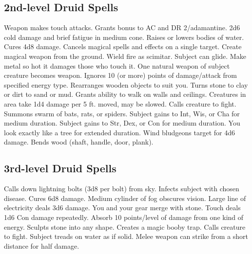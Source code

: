 \subsection{2nd-level Druid Spells}
\begin{spelllist}
   Weapon makes touch attacks. 
   Grants  bonus to AC and DR 2/adamantine.
   2d6 cold damage and brief fatigue in medium cone.
   Raises or lowers bodies of water.
   Cures 4d8 damage.
   Cancels magical spells and effects on a single target.
   Create magical weapon from the ground.
   Wield fire as scimitar.
   Subject can glide.
   Make metal so hot it damages those who touch it.
   One natural weapon of subject creature becomes  weapon.
   Ignores 10 (or more) points of damage/attack from specified energy type.
   Rearranges wooden objects to suit you.
   Turns stone to clay or dirt to sand or mud.
   Grants ability to walk on walls and ceilings.
   Creatures in area take 1d4 damage per 5 ft. moved, may be slowed.
   Calls creature to fight.
   Summons swarm of bats, rats, or spiders.
   Subject gains  to Int, Wis, or Cha for medium duration.
   Subject gains  to Str, Dex, or Con for medium duration.
   You look exactly like a tree for extended duration.
   Wind bludgeons target for 4d6 damage.
   Bends wood (shaft, handle, door, plank).
\end{spelllist}

\subsection{3rd-level Druid Spells}
\begin{spelllist}
   Calls down lightning bolts (3d8 per bolt) from sky.
   Infects subject with chosen disease.
   Cures 6d8 damage.
   Medium cylinder of fog obscures vision.
   Large line of electricity deals 3d6 damage.
   You and your gear merge with stone.
   Touch deals 1d6 Con damage repeatedly.
   Absorb 10 points/level of damage from one kind of energy.
   Sculpts stone into any shape.
   Creates a magic booby trap.
   Calls creature to fight.
   Subject treads on water as if solid.
   Melee weapon can strike from a short distance for half damage.
\end{spelllist}

